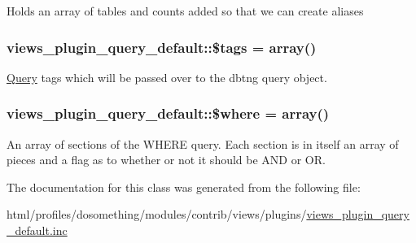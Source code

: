 \label{classviews__plugin__query__default_a11b47da6c7d595ee69d8b9a7e2dffcb2}
Holds an array of tables and counts added so that we can create aliases \hypertarget{classviews__plugin__query__default_a766a1b3fbce56e827df8270df72f3e3b}{
\subsubsection[{\$tags}]{\setlength{\rightskip}{0pt plus 5cm}views\_\-plugin\_\-query\_\-default::\$tags = array()}}
\label{classviews__plugin__query__default_a766a1b3fbce56e827df8270df72f3e3b}
\hyperlink{classQuery}{Query} tags which will be passed over to the dbtng query object. \hypertarget{classviews__plugin__query__default_a3b78c1aebd049aedc5adc16f545aaa4a}{
\subsubsection[{\$where}]{\setlength{\rightskip}{0pt plus 5cm}views\_\-plugin\_\-query\_\-default::\$where = array()}}
\label{classviews__plugin__query__default_a3b78c1aebd049aedc5adc16f545aaa4a}
An array of sections of the WHERE query. Each section is in itself an array of pieces and a flag as to whether or not it should be AND or OR. 

The documentation for this class was generated from the following file:\begin{DoxyCompactItemize}
\item 
html/profiles/dosomething/modules/contrib/views/plugins/\hyperlink{views__plugin__query__default_8inc}{views\_\-plugin\_\-query\_\-default.inc}\end{DoxyCompactItemize}
